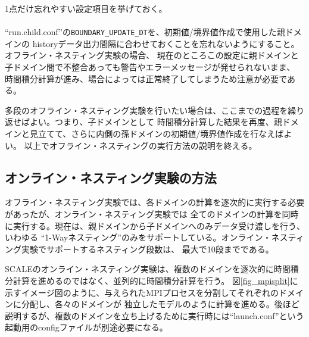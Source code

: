 1点だけ忘れやすい設定項目を挙げておく。\\

\\

\noindent ``run.child.conf''の\verb|BOUNDARY_UPDATE_DT|を、初期値/境界値作成で使用した親ドメインの
historyデータ出力間隔に合わせておくことを忘れないようにすること。オフライン・ネスティング実験の場合、
現在のところこの設定に親ドメインと子ドメイン間で不整合あっても警告やエラーメッセージが発せられないまま、
時間積分計算が進み、場合によっては正常終了してしまうため注意が必要である。

多段のオフライン・ネスティング実験を行いたい場合は、ここまでの過程を繰り返せばよい。つまり、子ドメインとして
時間積分計算した結果を再度、親ドメインと見立てて、さらに内側の孫ドメインの初期値/境界値作成を行なえばよい。
以上でオフライン・ネスティングの実行方法の説明を終える。


\subsection{オンライン・ネスティング実験の方法} \label{sec:nest_online}

オフライン・ネスティング実験では、各ドメインの計算を逐次的に実行する必要があったが、オンライン・ネスティング実験では
全てのドメインの計算を同時に実行する。現在は、親ドメインから子ドメインへのみデータ受け渡しを行う、いわゆる
``1-Wayネスティング''のみをサポートしている。オンライン・ネスティング実験でサポートするネスティング段数は、
最大で10段までである。

SCALEのオンライン・ネスティング実験は、複数のドメインを逐次的に時間積分計算を進めるのではなく、並列的に時間積分計算を行う。
図\ref{fig_mpisplit}に示すイメージ図のように、与えられたMPIプロセスを分割してそれぞれのドメインに分配し、各々のドメインが
独立したモデルのように計算を進める。後ほど説明するが、複数のドメインを立ち上げるために実行時には``launch.conf''という
起動用のconfigファイルが別途必要になる。


